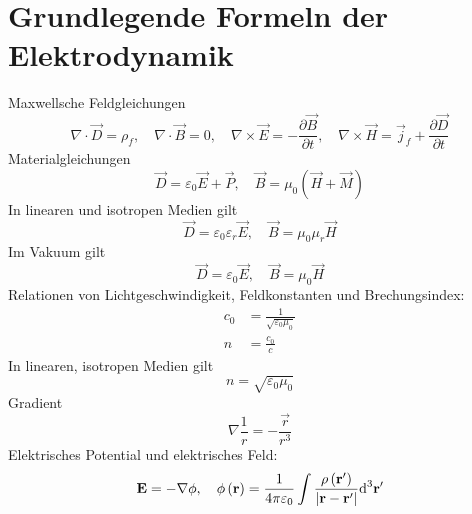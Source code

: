 \section{Grundlegende Formeln der Elektrodynamik}

Maxwellsche Feldgleichungen
\begin{equation*}
	\nabla \cdot \vec {D}=\rho _{f},\quad\nabla \cdot \vec {B}=0,\quad\nabla \times \vec {E}=-\frac{\partial \vec {B}}{\partial t},\quad\nabla \times \vec {H}=\vec {j}_{f}+\frac{\partial \vec {D}}{\partial t}
\end{equation*}
Materialgleichungen
\begin{equation*}
	\vec {D}=\varepsilon _{0}\vec {E}+\vec {P},\quad \vec {B}=\mu _{0}\left(\vec {H}+\vec {M}\right)
\end{equation*}
In linearen und isotropen Medien gilt
\begin{equation*}
	\vec {D}=\varepsilon _{0}\varepsilon _{r}\vec {E},\quad \vec {B}=\mu _{0}\mu _{r}\vec {H}
\end{equation*}
Im Vakuum gilt
\begin{equation*}
	\vec {D}=\varepsilon _{0}\vec {E}, \quad\vec {B}=\mu _{0}\vec {H}
\end{equation*}
Relationen von Lichtgeschwindigkeit, Feldkonstanten und Brechungsindex:
\begin{align*}
	c_{0} & =\frac{1}{\sqrt{\varepsilon _{0}\mu _{0}}} \\
	n     & =\frac{c_{0}}{c}
\end{align*}
In linearen, isotropen Medien gilt
\begin{equation*}
	n=\sqrt{\varepsilon _{0}\mu _{0}}
\end{equation*}
Gradient
\begin{equation*}
	\nabla \frac{1}{r}=-\frac{\vec {r}}{r^{3}}
\end{equation*}
Elektrisches Potential und elektrisches Feld:
\begin{equation*}
	\mathbf{E}=-\nabla \phi ,\quad \phi \left(\mathbf{r}\right)=\frac{1}{4\pi \varepsilon _{0}}\int \frac{\rho \left(\mathbf{r}'\right)}{\left| \mathbf{r}-\mathbf{r}'\right| }\text{d} ^{3}\mathbf{r}'
\end{equation*}
